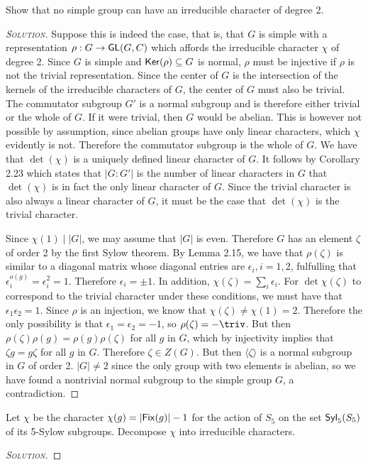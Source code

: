 \begin{problem}[Isaacs 3.3] Show that no simple group can have an irreducible character of degree 2.

\end{problem}

\begin{proof}[{\scshape Solution}]
Suppose this is indeed the case, that is, that $G$ is simple with a representation $\rho: G \to \mathsf{GL}(G, C)$ which affords the irreducible character $\chi$ of degree 2. Since $G$ is simple and $\mathsf{Ker}(\rho) \subseteq G$ is normal, $\rho$ must be injective if $\rho$ is not the trivial representation. Since the center of $G$ is the intersection of the kernels of the irreducible characters of $G$, the center of $G$ must also be trivial. The commutator subgroup $G'$ is a normal subgroup and is therefore either trivial or the whole of $G$. If it were trivial, then $G$ would be abelian. This is however not possible by assumption, since abelian groups have only linear characters, which $\chi$ evidently is not. Therefore the commutator subgroup is the whole of $G$. We have that $\det(\chi)$ is a uniquely defined linear character of $G$. It follows by Corollary 2.23 which states that $\lvert G : G'\rvert$ is the number of linear characters in $G$ that $\det(\chi)$ is in fact the only linear character of $G$. Since the trivial character is also always a linear character of $G$, it must be the case that $\det(\chi)$ is the trivial character.

Since $\chi(1) \mid \lvert G \rvert$, we may assume that $\lvert G\rvert$ is even. Therefore $G$ has an element $\zeta$ of order 2 by the first Sylow theorem. By Lemma 2.15, we have that $\rho(\zeta)$ is similar to a diagonal matrix whose diagonal entries are $\epsilon_i, i = 1, 2$, fulfulling that $\epsilon_i^{o(g)} = \epsilon_i^{2} = 1$. Therefore $\epsilon_i = \pm 1$. In addition, $\chi(\zeta) = \sum_i \epsilon_i$. For $\det{\chi}(\zeta)$ to correspond to the trivial character under these conditions, we must have that $\epsilon_1\epsilon_2 = 1$. Since $\rho$ is an injection, we know that $\chi(\zeta) \neq \chi(1) = 2$. Therefore the only possibility is that $\epsilon_1 = \epsilon_2 = -1$, so $\rho(\zeta) = -\triv$. But then $\rho(\zeta)\rho(g) = \rho(g)\rho(\zeta)$ for all $g$ in $G$, which by injectivity implies that $\zeta g = g\zeta$ for all $g$ in $G$. Therefore $\zeta \in Z(G)$. But then $\langle \zeta \rangle$ is a normal subgroup in $G$ of order 2. $\lvert G \rvert \neq 2$ since the only group with two elements is abelian, so we have found a nontrivial normal subgroup to the simple group $G$, a contradiction.


\end{proof}

\newpage

\begin{problem}
Let $\chi$ be the character $\chi(g) = \lvert \mathsf{Fix}(g) \rvert -1$ for the action of $S_5$ on the set $\mathsf{Syl}_5(S_5)$ of its 5-Sylow subgroups. Decompose $\chi$ into irreducible characters.


\end{problem}

\begin{proof}[{\scshape Solution}]

\end{proof}





